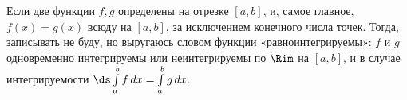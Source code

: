 
 	Если две функции $f,g$ определены на отрезке $[a,b]$, и, самое главное, $f(x)=g(x)$ всюду на $[a,b]$, за исключением конечного числа точек.
 	Тогда, записывать не буду, но выругаюсь словом функции «равноинтегрируемы»: $f$ и $g$ одновременно интегрируемы или неинтегрируемы
 	по $\Rim$ на $[a,b]$, и в случае интегрируемости $\ds\int\limits_a^bf\,dx=\int\limits_a^bg\,dx$.
 